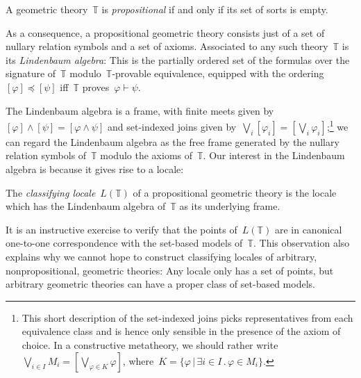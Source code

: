 \documentclass{ws-rv9x6}
\newcommand{\TT}{\mathbb{T}}
\renewcommand{\_}{\mathpunct{.}}
\newcommand{\?}{\,{:}\,}
\begin{document}
\begin{definition}A geometric theory~$\TT$ is \emph{propositional} if and only
if its set of sorts is empty.\end{definition}

As a consequence, a propositional geometric theory consists just of a set of
nullary relation symbols and a set of axioms. Associated to any such
theory~$\TT$ is its \emph{Lindenbaum algebra}: This is the partially ordered
set of the formulas over the signature of~$\TT$ modulo~$\TT$-provable
equivalence, equipped with the ordering~$[\varphi] \preceq [\psi]$ iff~$\TT$
proves~$\varphi \vdash \psi$.

The Lindenbaum algebra is a frame, with finite meets given by~$[\varphi] \wedge
[\psi] = [\varphi \wedge \psi]$ and set-indexed joins given by~$\bigvee_i
[\varphi_i] = [\bigvee_i \varphi_i]$;\footnote{This short description of the
set-indexed joins picks representatives from each equivalence class and is
hence only sensible in the presence of the axiom of choice. In a
constructive metatheory, we should rather write~$\bigvee_{i \in I} M_i =
[\bigvee_{\varphi \in K} \varphi]$, where~$K = \{ \varphi \,|\, \exists i \in
I\_ \varphi \in M_i \}$.} we can regard the Lindenbaum algebra as the free
frame generated by the nullary relation symbols of~$\TT$ modulo the axioms
of~$\TT$. Our interest in the Lindenbaum algebra is because it gives rise to a
locale:

\begin{definition}The \emph{classifying locale}~$L(\TT)$ of a propositional
geometric theory is the locale which has the Lindenbaum algebra of~$\TT$ as its
underlying frame.\end{definition}

It is an instructive exercise to verify that the points of~$L(\TT)$ are in
canonical one-to-one correspondence with the set-based models of~$\TT$. This
observation also explains why we cannot hope to construct classifying
locales of arbitrary, nonpropositional, geometric theories: Any locale only has
a set of points, but arbitrary geometric theories can have a proper class of
set-based models.
\end{document}

